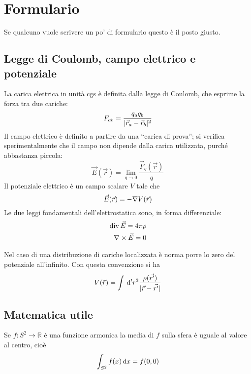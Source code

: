\documentclass[../main.tex]{subfiles}
\begin{document}
\section{Formulario}
\setcounter{equation}{0}
\renewcommand{\theequation}{F.\arabic{equation}}

Se qualcuno vuole scrivere un po' di formulario questo è il posto giusto.

\subsection{Legge di Coulomb, campo elettrico e potenziale}\label{Preliminari}
La carica elettrica in unità cgs è definita dalla legge di Coulomb, che esprime la forza tra due cariche:
\begin{equation}
  \label{Coulomb}
  F_{ab}=\frac{q_aq_b}{\lvert\vec r_a -\vec r_b\rvert^2}
\end{equation}
Il campo elettrico è definito a partire da una ``carica di prova''; si verifica sperimentalmente che il campo non dipende dalla carica utilizzata, purché abbastanza piccola:
\begin{equation}
  \label{CampoElettrico}
  \vec E(\vec r)=\lim_{q \to 0} \frac{\vec F_q(\vec r)}{q}
\end{equation}
Il potenziale elettrico è un campo scalare $V$ tale che
\begin{equation}
  \label{Potenziale}
  \vec E(\vec r) = - \nabla V(\vec r)
\end{equation}
Le due leggi fondamentali dell'elettrostatica sono, in forma differenziale:
\begin{subequations}
  \label{DifferenzialiElettrostatica}
  \begin{align}
    \operatorname{div} \vec E = 4 \pi \rho\\
    \nabla\times \vec E = 0
  \end{align}
\end{subequations}

Nel caso di una distribuzione di cariche localizzata è norma porre lo zero del potenziale all'infinito. Con questa convenzione si ha
\begin{equation}\label{PotenzialeLocalizzato}
	V(\vec{r})=\int \,\mathrm d' r^3 \frac{\rho(\vec{r'})}{|\vec{r}-\vec{r'}|}
\end{equation}



\subsection{Matematica utile}\label{Matematica}
\begin{theorem}
  \label{ThMedia}
  Se $f:S^2 \to \mathbb{R}$ \`e una funzione armonica la media di $f$ sulla sfera è uguale al valore al centro, cioè
  \begin{equation}
    \int_{S^2} f(x) \,\mathrm d x = f(0,0)
  \end{equation}
\end{theorem}
\end{document}
